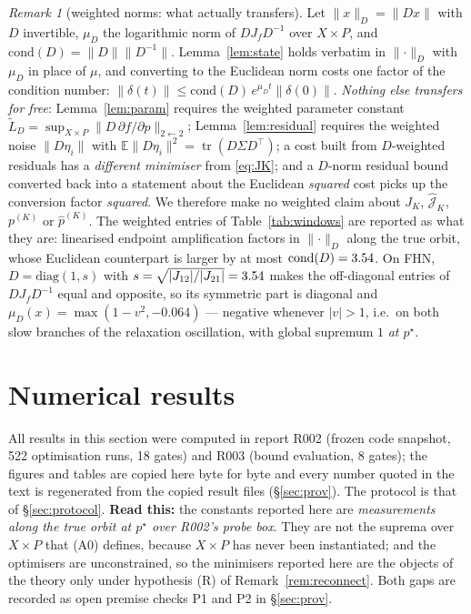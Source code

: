 \documentclass[11pt]{article}
\theoremstyle{remark}\newtheorem{remark}{Remark}
\newcommand{\pstar}{p^\star}
\newcommand{\norm}[1]{\lVert #1\rVert}
\newcommand{\hatJ}{\hat{\mathcal J}}
\newcommand{\readthis}[1]{\textbf{Read this:} #1}
\begin{document}
\begin{remark}[weighted norms: what actually transfers]\label{rem:weighted}
Let $\norm{x}_D=\norm{Dx}$ with $D$ invertible, $\mu_D$ the logarithmic norm of $DJ_fD^{-1}$ over $X\times P$, and $\mathrm{cond}(D)=\norm D\norm{D^{-1}}$. Lemma~\ref{lem:state} holds verbatim in $\norm\cdot_D$ with $\mu_D$ in place of $\mu$, and converting to the Euclidean norm costs one factor of the condition number: $\norm{\delta(t)}\le\mathrm{cond}(D)\,e^{\mu_D t}\norm{\delta(0)}$. \emph{Nothing else transfers for free}: Lemma~\ref{lem:param} requires the weighted parameter constant $\tilde L_D=\sup_{X\times P}\norm{D\,\partial f/\partial p}_{2\leftarrow2}$; Lemma~\ref{lem:residual} requires the weighted noise $\norm{D\eta_i}$ with $\mathbb E\norm{D\eta_i}^2=\operatorname{tr}(D\Sigma D^\top)$; a cost built from $D$-weighted residuals has a \emph{different minimiser} from \eqref{eq:JK}; and a $D$-norm residual bound converted back into a statement about the Euclidean \emph{squared} cost picks up the conversion factor \emph{squared}. We therefore make no weighted claim about $J_K$, $\hatJ_K$, $p^{(K)}$ or $\hat p^{(K)}$. The weighted entries of Table~\ref{tab:windows} are reported as what they are: linearised endpoint amplification factors in $\norm\cdot_D$ along the true orbit, whose Euclidean counterpart is larger by at most $\mathrm{cond}(D)=3.54$. On FHN, $D=\mathrm{diag}(1,s)$ with $s=\sqrt{|J_{12}|/|J_{21}|}=3.54$ makes the off-diagonal entries of $DJ_fD^{-1}$ equal and opposite, so its symmetric part is diagonal and $\mu_D(x)=\max(1-v^2,-0.064)$ --- negative whenever $|v|>1$, i.e.\ on both slow branches of the relaxation oscillation, with global supremum $1$ \emph{at $\pstar$}.
\end{remark}

\section{Numerical results}\label{sec:num}
All results in this section were computed in report R002 (frozen code snapshot, 522 optimisation runs, 18 gates) and R003 (bound evaluation, 8 gates); the figures and tables are copied here byte for byte and every number quoted in the text is regenerated from the copied result files (\S\ref{sec:prov}). The protocol is that of \S\ref{sec:protocol}. \readthis{the constants reported here are \emph{measurements along the true orbit at $\pstar$ over R002's probe box}. They are not the suprema over $X\times P$ that (A0) defines, because $X\times P$ has never been instantiated; and the optimisers are unconstrained, so the minimisers reported here are the objects of the theory only under hypothesis (R) of Remark~\ref{rem:reconnect}. Both gaps are recorded as open premise checks P1 and P2 in \S\ref{sec:prov}.}
\end{document}
